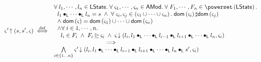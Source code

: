 %
%
%
\begin{definition}
%
\[
\expandsAM{\amod{}'}{s}{s'}{\amod{}} \iffdef 
\begin{array}{l}
	\for{l_1,\cdots,l_n \in \LState}\for{\amod{1},\cdots,\amod{n} \in \AMods}\for{F_1, \cdots,F_n \in \pset{\LState}}\\
	
	\hspace*{0.2cm} l_1 \composeL  \cdots \composeL l_n = s \;\land\; \for{\amod{i}, \amod{j} \in \left(\amod{1} \cup \cdots \cup \amod{n}\right)} \dom{\amod{i}} \disjoint \dom{\amod{j}}\\
	
	\hspace*{0.2cm}\land\; \dom{\amod{}} = \dom{\amod{1}} \cup \cdots \cup \dom{\amod{n}}\\
	
	\hspace*{0.2cm}\land\for{i \in 1, \cdots, n}\\
	\hspace*{0.4cm} l_i \in F_i \;\land\; F_i \strictfences \amod{i}
	\;\land\; \extendsAM{\amod{}}{l_i}{l_1 \composeL \cdots \composeL l_{i-1} \composeL l_{i+1} \composeL \cdots \composeL l_n}{\amod{i}}\\
	\hspace*{3cm}\implies\\
	\bigwedge\limits_{i \in \{1...n\}} \extendsAM{\amod{}'}{l_i}{l_1\composeL \cdots \composeL l_{i-1} \composeL l_{i+1}\composeL \cdots \composeL l_{n} \composeL s'}{\amod{i}}
\end{array}
\]
%
\end{definition}
